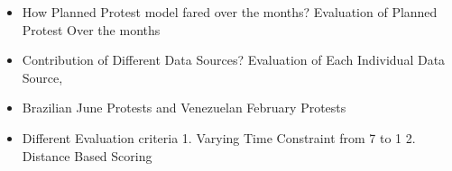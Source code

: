 \begin{itemize}
\item How Planned Protest model fared over the months?
Evaluation of Planned Protest Over the months

\item Contribution of Different Data Sources?
Evaluation of Each Individual Data Source,

\item Brazilian June Protests and Venezuelan February Protests 

\item Different Evaluation criteria
   1. Varying Time Constraint from 7 to 1
   2. Distance Based Scoring

\end{itemize}
